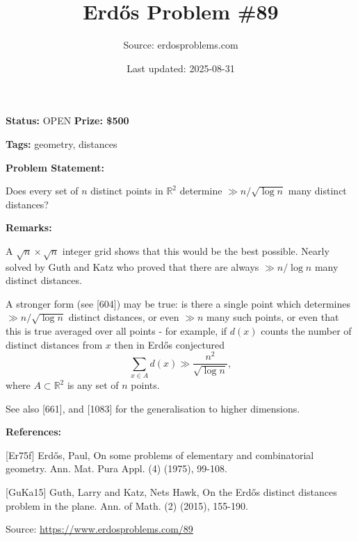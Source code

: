 \documentclass{article}
\title{Erd\H{o}s Problem \#89}
\date{Last updated: 2025-08-31}
\author{Source: erdosproblems.com}
\begin{document}
\maketitle

\noindent\textbf{Status:} OPEN \quad \textbf{Prize: \$500}

\noindent\textbf{Tags:} geometry, distances

\medskip
\noindent\textbf{Problem Statement:}

Does every set of $n$ distinct points in $\mathbb{R}^2$ determine $\gg n/\sqrt{\log n}$ many distinct distances?

\bigskip
\noindent\textbf{Remarks:}

A $\sqrt{n}\times\sqrt{n}$ integer grid shows that this would be the best possible. Nearly solved by Guth and Katz \cite{GuKa15} who proved that there are always $\gg n/\log n$ many distinct distances. 

A stronger form (see [604]) may be true: is there a single point which determines $\gg n/\sqrt{\log n}$ distinct distances, or even $\gg n$ many such points, or even that this is true averaged over all points - for example, if $d(x)$ counts the number of distinct distances from $x$ then in \cite{Er75f} Erd\H{o}s conjectured\[\sum_{x\in A}d(x) \gg \frac{n^2}{\sqrt{\log n}},\]where $A\subset \mathbb{R}^2$ is any set of $n$ points.

See also [661], and [1083] for the generalisation to higher dimensions.

\bigskip
\noindent\textbf{References:}

[Er75f] Erd\H{o}s, Paul, On some problems of elementary and combinatorial geometry. Ann. Mat. Pura Appl. (4) (1975), 99-108.
 
 [GuKa15] Guth, Larry and Katz, Nets Hawk, On the Erd\H{o}s distinct distances problem in the plane. Ann. of Math. (2) (2015), 155-190.

\bigskip
\noindent\small{Source: \url{https://www.erdosproblems.com/89}}
\end{document}
